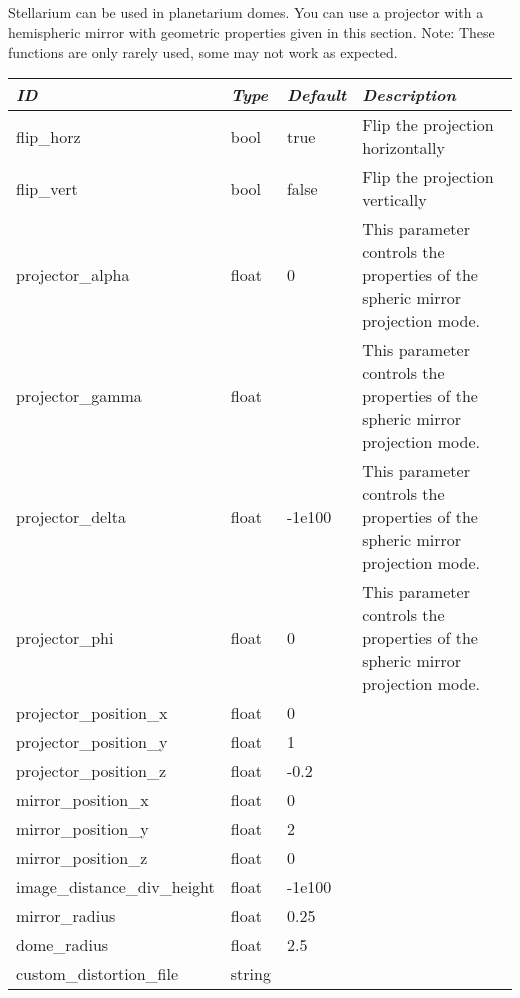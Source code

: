 \subsection{}\label{sec:config.ini:spheric_mirror}

Stellarium can be used in planetarium domes. You can use a projector with a hemispheric mirror with geometric properties given in this section. 
Note: These functions are only rarely used, some may not work as expected.
 
\begin{longtabu} to \textwidth {l|l|l|X}\toprule
\emph{ID} & \emph{Type} & \emph{Default}&\emph{Description}\\\midrule
flip\_horz             & bool  &true & Flip the projection horizontally\\\midrule
flip\_vert             & bool  &false& Flip the projection vertically\\\midrule
projector\_alpha       & float &0& This parameter controls the properties of the spheric mirror projection mode.\\\midrule
projector\_gamma       & float && This parameter controls the properties of the spheric mirror projection mode.\\\midrule
projector\_delta       & float &-1e100& This parameter controls the properties of the spheric mirror projection mode.\\\midrule
projector\_phi         & float &0& This parameter controls the properties of the spheric mirror projection mode.\\\midrule
projector\_position\_x & float &0& \\\midrule
projector\_position\_y & float &1& \\\midrule
projector\_position\_z & float &-0.2& \\\midrule
mirror\_position\_x    & float &0& \\\midrule
mirror\_position\_y    & float &2& \\\midrule
mirror\_position\_z    & float &0& \\\midrule
image\_distance\_div\_height&float&-1e100\\\midrule
mirror\_radius         & float &0.25& \\\midrule
dome\_radius           & float &2.5& \\\midrule
custom\_distortion\_file& string& \\\midrule

\end{longtabu}
